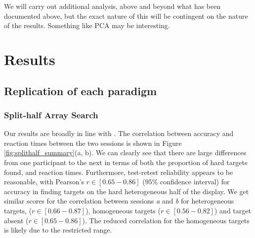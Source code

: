 \documentclass[]{rsos}%
\begin{document}
We will carry out additional analysis, above and beyond what has been documented above, but the exact nature of this will be contingent on the nature of the results. Something like PCA may be interesting. 

\section{Results}

\subsection{Replication of each paradigm}

\subsubsection{Split-half Array Search}
Our results are broadly in line with \cite{nowakowsak2017}. The correlation between accuracy and reaction times between the two sessions is shown in Figure \ref{fig:splithalf_summary}(a, b). We can clearly see that there are large differences from one participant to the next in terms of both the proportion of hard targets found, and reaction times. Furthermore, test-retest reliability appears to be reasonable, with Pearson's $r \in [0.65-0.86]$ ($95\%$ confidence interval) for accuracy in finding targets on the hard heterogeneous half of the display. We get similar scores for the correlation between sessions \textit{a} and \textit{b} for heterogeneous targets, ($r \in [0.66-0.87]$), homogeneous targets ($r \in [0.56-0.82]$) and target absent ($r \in [0.65-0.86]$). The reduced correlation for the homogeneous targets is likely due to the restricted range.
\end{document}
